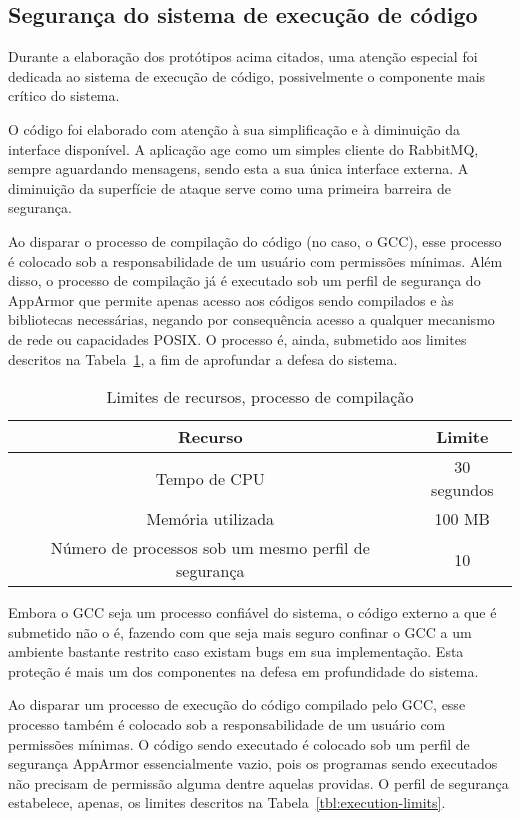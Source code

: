 \documentclass[ruledheader, 12pt]{abnt}
\newcommand{\tblref}[1]{Tabela~\ref{tbl:#1}}
\begin{document}
\subsection{Segurança do sistema de execução de código}

Durante a elaboração dos protótipos acima citados, uma atenção especial foi dedicada ao sistema de execução de código, possivelmente o componente mais crítico do sistema. 

O código foi elaborado com atenção à sua simplificação e à diminuição da interface disponível. A aplicação age como um simples cliente do RabbitMQ, sempre aguardando mensagens, sendo esta a sua única interface externa. A diminuição da superfície de ataque serve como uma primeira barreira de segurança.


Ao disparar o processo de compilação do código (no caso, o GCC), esse processo é colocado sob a responsabilidade de um usuário com permissões mínimas. Além disso, o processo de compilação já é executado sob um perfil de segurança do AppArmor que permite apenas acesso aos códigos sendo compilados e às bibliotecas necessárias, negando por consequência acesso a qualquer mecanismo de rede ou capacidades POSIX. O processo é, ainda, submetido aos limites descritos na \tblref{compilation-limits}, a fim de aprofundar a defesa do sistema.

\begin{table}[h]
	\centering
	\caption{\label{tbl:compilation-limits}Limites de recursos, processo de compilação}
	\begin{tabular}{c c}\hline
		\hline
		Recurso & Limite \\\hline
		\hline
		Tempo de CPU & 30 segundos \\\hline
		Memória utilizada & 100 MB \\\hline
		Número de processos sob um mesmo perfil de segurança & 10 \\\hline
		\hline
	\end{tabular}
\end{table}

Embora o GCC seja um processo confiável do sistema, o código externo a que é submetido não o é, fazendo com que seja mais seguro confinar o GCC a um ambiente bastante restrito caso existam bugs em sua implementação. Esta proteção é mais um dos componentes na defesa em profundidade do sistema.

Ao disparar um processo de execução do código compilado pelo GCC, esse processo também é colocado sob a responsabilidade de um usuário com permissões mínimas. O código sendo executado é colocado sob um perfil de segurança AppArmor essencialmente vazio, pois os programas sendo executados não precisam de permissão alguma dentre aquelas providas. O perfil de segurança estabelece, apenas, os limites descritos na \tblref{execution-limits}.
\end{document}
